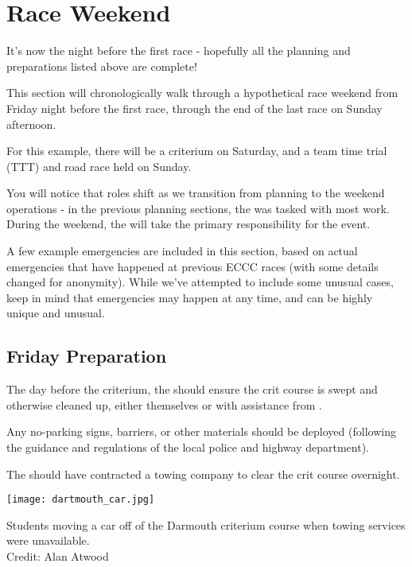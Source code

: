 \section{Race Weekend}

It's now the night before the first race - hopefully all the planning and preparations listed above are complete!

This section will chronologically walk through a hypothetical race weekend from Friday night before the first race,
through the end of the last race on Sunday afternoon.

For this example, there will be a criterium on Saturday,
and a team time trial (TTT) %
and road race held on Sunday.

You will notice that roles shift as we transition from planning to the weekend operations -
in the previous planning sections, the  was tasked with most work.
During the weekend, the  will take the primary responsibility for the event.

A few example emergencies are included in this section, based on actual emergencies that have happened at previous ECCC races
(with some details changed for anonymity).
While we've attempted to include some unusual cases, keep in mind that emergencies may happen at any time, and can be highly unique and unusual.

\subsection{Friday Preparation}

The day before the criterium, the  should ensure the crit course is swept and otherwise cleaned up,
either themselves or with assistance from .

Any no-parking signs, barriers, or other materials should be deployed (following the guidance and regulations of the local police and highway department).

The  should have contracted a towing company to clear the crit course overnight.

\begin{marginfigure}
  \texttt{[image: dartmouth\_car.jpg]}
  \caption[Students moving a car off a criterium course]{
            Students moving a car off of the Darmouth criterium course
            when towing services were unavailable.\\
            Credit: Alan Atwood}
\end{marginfigure}

